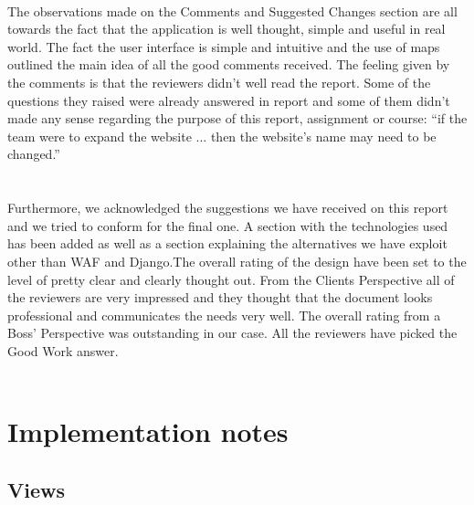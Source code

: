 \documentclass{sig-alt-release2}
\begin{document}
\\
The observations made on the Comments and Suggested Changes section are all 
towards the fact that the application is well thought, simple and useful in 
real world. The fact the user interface is simple and intuitive and the use 
of maps outlined the main idea of all the good comments received. The feeling 
given by the comments is that the reviewers didn't well read the report. Some 
of the questions they raised were already answered in report and some of them 
didn't made any sense regarding the purpose of this report, assignment or 
course: ``if the team were to expand the website ... then the website's 
name may need to be changed.''\\
\\
\\
Furthermore, we acknowledged the suggestions we have received on this report 
and we tried to conform for the final one. A section with the technologies 
used has been added as well as a section explaining the alternatives we have 
exploit other than WAF and Django.The overall rating of the design have been 
set to the level of pretty clear and clearly thought out. From the Clients 
Perspective all of the reviewers are very impressed and they thought that the 
document looks professional and communicates the needs very well.  The overall 
rating from a Boss' Perspective was outstanding in our case. All the reviewers 
have picked the Good Work answer.\\
\\

\section{Implementation notes}

\subsection{Views}
\end{document}
